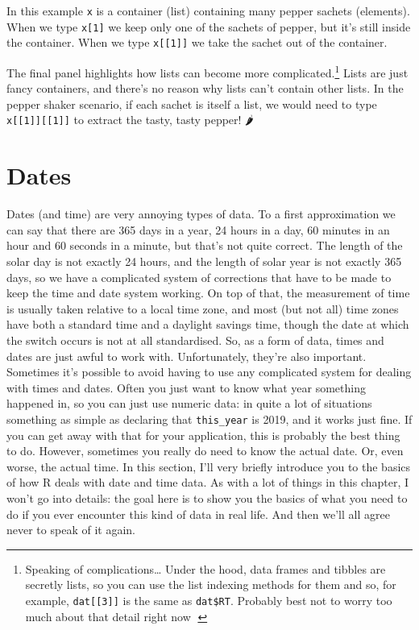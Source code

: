 \documentclass[]{book}
\let\rmarkdownfootnote\footnote%
\def\footnote{\protect\rmarkdownfootnote}
\begin{document}
In this example \texttt{x} is a container (list) containing many pepper sachets (elements). When we type \texttt{x{[}1{]}} we keep only one of the sachets of pepper, but it's still inside the container. When we type \texttt{x{[}{[}1{]}{]}} we take the sachet out of the container.

The final panel highlights how lists can become more complicated.\footnote{Speaking of complications\ldots{} Under the hood, data frames and tibbles are secretly lists, so you can use the list indexing methods for them and so, for example, \texttt{dat{[}{[}3{]}{]}} is the same as \texttt{dat\$RT}. Probably best not to worry too much about that detail right now 😬} Lists are just fancy containers, and there's no reason why lists can't contain other lists. In the pepper shaker scenario, if each sachet is itself a list, we would need to type \texttt{x{[}{[}1{]}{]}{[}{[}1{]}{]}} to extract the tasty, tasty pepper! 🌶

\hypertarget{dates}{%
\section{Dates}\label{dates}}

Dates (and time) are very annoying types of data. To a first approximation we can say that there are 365 days in a year, 24 hours in a day, 60 minutes in an hour and 60 seconds in a minute, but that's not quite correct. The length of the solar day is not exactly 24 hours, and the length of solar year is not exactly 365 days, so we have a complicated system of corrections that have to be made to keep the time and date system working. On top of that, the measurement of time is usually taken relative to a local time zone, and most (but not all) time zones have both a standard time and a daylight savings time, though the date at which the switch occurs is not at all standardised. So, as a form of data, times and dates are just awful to work with. Unfortunately, they're also important. Sometimes it's possible to avoid having to use any complicated system for dealing with times and dates. Often you just want to know what year something happened in, so you can just use numeric data: in quite a lot of situations something as simple as declaring that \texttt{this\_year} is 2019, and it works just fine. If you can get away with that for your application, this is probably the best thing to do. However, sometimes you really do need to know the actual date. Or, even worse, the actual time. In this section, I'll very briefly introduce you to the basics of how R deals with date and time data. As with a lot of things in this chapter, I won't go into details: the goal here is to show you the basics of what you need to do if you ever encounter this kind of data in real life. And then we'll all agree never to speak of it again.
\end{document}

